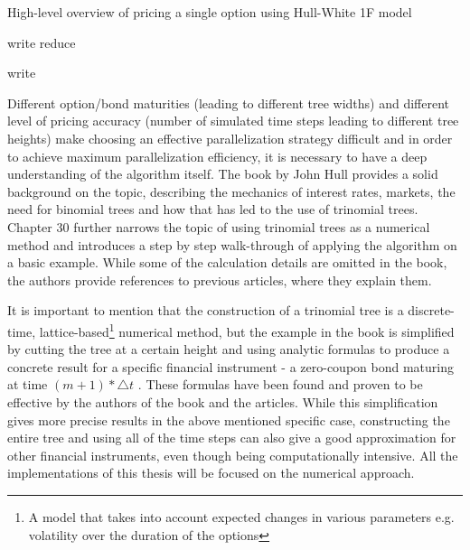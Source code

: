 \begin{algorithm}[H]
    \DontPrintSemicolon
    \caption{High-level overview of pricing a single option using Hull-White 1F model     \label{alg:loops}}
    
     {
         {
            write\;
        }
        reduce\;
    }
    
     {
         {
            write\;
        }
    }
\end{algorithm}

Different option/bond maturities (leading to different tree widths) and different level of pricing accuracy (number of simulated time steps leading to different tree heights) make choosing an effective parallelization strategy difficult and in order to achieve maximum parallelization efficiency, it is necessary to have a deep understanding of the algorithm itself. The book by John Hull\cite{ofod} provides a solid background on the topic, describing the mechanics of interest rates, markets, the need for binomial trees and how that has led to the use of trinomial trees. Chapter 30 further narrows the topic of using trinomial trees as a numerical method and introduces a step by step walk-through of applying the algorithm on a basic example. While some of the calculation details are omitted in the book, the authors provide references to previous articles\cite{npfits}\cite{uhwirt}, where they explain them. 

It is important to mention that the construction of a trinomial tree is a discrete-time, lattice-based\footnote{A model that takes into account expected changes in various parameters e.g. volatility over the duration of the options} numerical method, but the example in the book is simplified by cutting the tree at a certain height and using analytic formulas to produce a concrete result for a specific financial instrument - a zero-coupon bond maturing at time $(m + 1) * \triangle t$ \cite[pg. 704]{ofod}. These formulas have been found and proven to be effective by the authors of the book and the articles. While this simplification gives more precise results in the above mentioned specific case, constructing the entire tree and using all of the time steps can also give a good approximation for other financial instruments, even though being computationally intensive. All the implementations of this thesis will be focused on the numerical approach.

